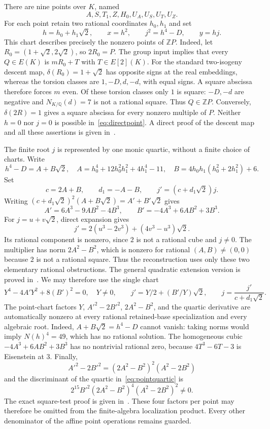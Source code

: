 \documentclass[11pt,a4paper]{article}
\newcommand{\Q}{\mathbb Q}\newcommand{\Z}{\mathbb Z}
\begin{document}
There are nine points over $K$, named
\[
 A,S,T_1,Z,H_0,U_A,U_S,U_T,U_Z.
\]
For each point retain two rational coordinates $h_0,h_1$ and set
\begin{equation}\label{eq:directpoint}
 h=h_0+h_1\sqrt2,\qquad x=h^2,\qquad
 j^2=h^4-D,\qquad y=hj.
\end{equation}
This chart describes precisely the nonzero points of $\Z P$.
Indeed, let $R_0=(1+\sqrt2,2\sqrt2)$, so $2R_0=P$.
The group input implies that every $Q\in E(K)$ is $mR_0+T$
with $T\in E[2](K)$. For the standard two-isogeny descent map,
$\delta(R_0)=1+\sqrt2$ has opposite signs at the real embeddings,
whereas the torsion classes are $1,-D,d,-d$, with equal signs.
A square abscissa therefore forces $m$ even. Of these torsion
classes only $1$ is square: $-D,-d$ are negative and
$N_{K/\Q}(d)=7$ is not a rational square. Thus $Q\in\Z P$.
Conversely, $\delta(2R)=1$ gives a square abscissa for every
nonzero multiple of $P$. Neither $h=0$ nor $j=0$ is possible
in~\eqref{eq:directpoint}. A direct proof of the descent map
and all these assertions is given in~\cite{SquareCharts}.

The finite root $j$ is represented by one monic quartic,
without a finite choice of charts. Write
\[
 h^4-D=A+B\sqrt2,
 \quad A=h_0^4+12h_0^2h_1^2+4h_1^4-11,
 \quad B=4h_0h_1(h_0^2+2h_1^2)+6.
\]
Set
\[
 c=2A+B,\qquad d_1=-A-B,\qquad j'=(c+d_1\sqrt2)j.
\]
Writing $(c+d_1\sqrt2)^2(A+B\sqrt2)=A'+B'\sqrt2$ gives
\[
 A'=6A^3-9AB^2-4B^3,\qquad
 B'=-4A^3+6AB^2+3B^3.
\]
For $j=u+v\sqrt2$, direct expansion gives
\[
 j'=2(u^3-2v^3)+(4v^3-u^3)\sqrt2.
\]
Its rational component is nonzero, since $2$ is not a rational
cube and $j\ne0$. The multiplier has norm $2A^2-B^2$,
which is nonzero for rational $(A,B)\ne(0,0)$ because $2$
is not a rational square. Thus the reconstruction uses only
these two elementary rational obstructions. The general quadratic
extension version is proved in~\cite{QuadraticCharts}.
We may therefore use the single chart
\begin{equation}\label{eq:pointquartic}
 Y^4-4A'Y^2+8(B')^2=0,\quad Y\ne0,\qquad
 j'=Y/2+(B'/Y)\sqrt2,\qquad
 j=\frac{j'}{c+d_1\sqrt2}.
\end{equation}
The point-chart factors $Y$, $A'^2-2B'^2$, $2A^2-B^2$,
and the quartic derivative are automatically nonzero at every
rational retained-base specialization and every algebraic root.
Indeed, $A+B\sqrt2=h^4-D$ cannot vanish: taking norms would
imply $N(h)^4=49$, which has no rational solution. The homogeneous cubic
$-4A^3+6AB^2+3B^3$ has no nontrivial rational zero, because
$4T^3-6T-3$ is Eisenstein at $3$. Finally,
\[
 A'^2-2B'^2=(2A^2-B^2)^2(A^2-2B^2)
\]
and the discriminant of the quartic in~\eqref{eq:pointquartic} is
\[
                 2^{15}B'^2(2A^2-B^2)^4(A^2-2B^2)^2\ne0.
\]
The exact square-test proof is given in~\cite{SquarePredicate}.
These four factors per point may therefore be omitted from the
finite-algebra localization product. Every other denominator of the
affine point operations remains guarded.
\end{document}

